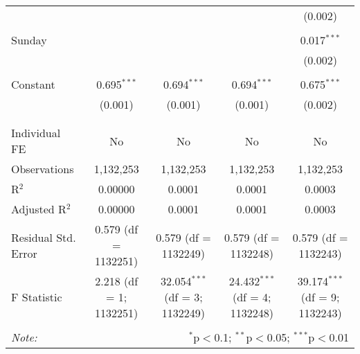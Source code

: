 \documentclass[
]{article}
\begin{document}
\begin{table}[!htbp]
{\begin{tabular}{@{\extracolsep{5pt}}lcccc}
  &  &  &  & (0.002) \\ 
  & & & & \\ 
 Sunday &  &  &  & 0.017$^{***}$ \\ 
  &  &  &  & (0.002) \\ 
  & & & & \\ 
 Constant & 0.695$^{***}$ & 0.694$^{***}$ & 0.694$^{***}$ & 0.675$^{***}$ \\ 
  & (0.001) & (0.001) & (0.001) & (0.002) \\ 
  & & & & \\ 
\hline \\[-1.8ex] 
Individual FE & No & No & No & No \\ 
Observations & 1,132,253 & 1,132,253 & 1,132,253 & 1,132,253 \\ 
R$^{2}$ & 0.00000 & 0.0001 & 0.0001 & 0.0003 \\ 
Adjusted R$^{2}$ & 0.00000 & 0.0001 & 0.0001 & 0.0003 \\ 
Residual Std. Error & 0.579 (df = 1132251) & 0.579 (df = 1132249) & 0.579 (df = 1132248) & 0.579 (df = 1132243) \\ 
F Statistic & 2.218 (df = 1; 1132251) & 32.054$^{***}$ (df = 3; 1132249) & 24.432$^{***}$ (df = 4; 1132248) & 39.174$^{***}$ (df = 9; 1132243) \\ 
\hline 
\hline \\[-1.8ex] 
\textit{Note:}  & \multicolumn{4}{r}{$^{*}$p$<$0.1; $^{**}$p$<$0.05; $^{***}$p$<$0.01} \\ 
\end{tabular}
} 
\end{table} 
\newpage
\end{document}
